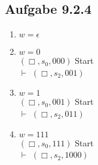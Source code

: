 \documentclass[12pt]{article}
\begin{document}
 \subsection*{Aufgabe 9.2.4}
 \begin{enumerate}
 \item $w=\epsilon$\\
 \item $w=0$\\
 $(\Box,s_0,000)$ Start \\
$\vdash$   $(\Box ,s_2,001)$  
 \item $w=1$\\
 $(\Box,s_0,001)$ Start \\
$\vdash$   $(\Box ,s_2,011)$  
 \item $w=111$\\
 $(\Box,s_0,111)$ Start \\
$\vdash$   $(\Box ,s_2,1000)$  
 \end{enumerate}


 
\end{document}
